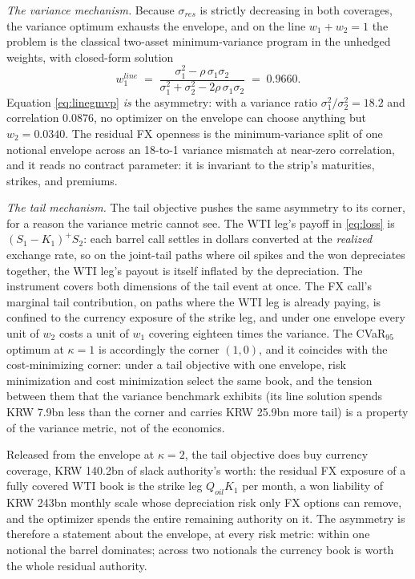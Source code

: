 \documentclass[11pt,a4paper]{article}
\begin{document}
\emph{The variance mechanism.} Because $\sigma_{res}$ is strictly decreasing in both coverages, the variance optimum exhausts the envelope, and on the line $w_1+w_2=1$ the problem is the classical two-asset minimum-variance program in the unhedged weights, with closed-form solution
\begin{equation}
w_1^{line} \;=\; \frac{\sigma_1^2 - \rho\,\sigma_1\sigma_2}{\sigma_1^2 + \sigma_2^2 - 2\rho\,\sigma_1\sigma_2}
\;=\; 0.9660.
\label{eq:linegmvp}
\end{equation}
Equation \eqref{eq:linegmvp} \emph{is} the asymmetry: with a variance ratio $\sigma_1^2/\sigma_2^2=18.2$ and correlation $0.0876$, no optimizer on the envelope can choose anything but $w_2=0.0340$. The residual FX openness is the minimum-variance split of one notional envelope across an 18-to-1 variance mismatch at near-zero correlation, and it reads no contract parameter: it is invariant to the strip's maturities, strikes, and premiums.

\emph{The tail mechanism.}
\label{sec:tail}
The tail objective pushes the same asymmetry to its corner, for a reason the variance metric cannot see. The WTI leg's payoff in \eqref{eq:loss} is $(S_1-K_1)^+S_2$: each barrel call settles in dollars converted at the \emph{realized} exchange rate, so on the joint-tail paths where oil spikes and the won depreciates together, the WTI leg's payout is itself inflated by the depreciation. The instrument covers both dimensions of the tail event at once. The FX call's marginal tail contribution, on paths where the WTI leg is already paying, is confined to the currency exposure of the strike leg, and under one envelope every unit of $w_2$ costs a unit of $w_1$ covering eighteen times the variance. The CVaR$_{95}$ optimum at $\kappa=1$ is accordingly the corner $(1,0)$, and it coincides with the cost-minimizing corner: under a tail objective with one envelope, risk minimization and cost minimization select the same book, and the tension between them that the variance benchmark exhibits (its line solution spends KRW 7.9bn less than the corner and carries KRW 25.9bn more tail) is a property of the variance metric, not of the economics.

Released from the envelope at $\kappa=2$, the tail objective does buy currency coverage, KRW 140.2bn of slack authority's worth: the residual FX exposure of a fully covered WTI book is the strike leg $Q_{oil}K_1$ per month, a won liability of KRW 243bn monthly scale whose depreciation risk only FX options can remove, and the optimizer spends the entire remaining authority on it. The asymmetry is therefore a statement about the envelope, at every risk metric: within one notional the barrel dominates; across two notionals the currency book is worth the whole residual authority.
\end{document}
